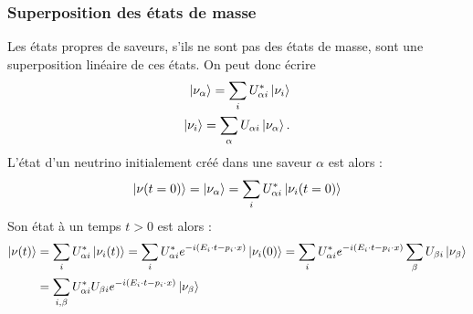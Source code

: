       \subsubsection{Superposition des états de masse}
        Les états propres de saveurs, s'ils ne sont pas des états de masse, sont une superposition linéaire de ces états. On peut donc écrire
        \begin{eqnarray}
          \ket{\nu_{\alpha}} = \sum_i U_{\alpha i}^*\ket{\nu_i} \label{eq::alphatoi} \\
          \ket{\nu_i} = \sum_{\alpha} U_{\alpha i}\ket{\nu_{\alpha}}.
        \end{eqnarray}
        L'état d'un neutrino initialement créé dans une saveur $\alpha$ est alors :
        \begin{equation}
          \ket{\nu(t=0)} = \ket{\nu_{\alpha}} = \sum_i U_{\alpha i}^*\ket{\nu_i(t=0)}
        \end{equation}
        Son état à un temps $t > 0$ est alors :
        \begin{equation}\label{eq::0tot}
          \begin{split}
            \ket{\nu(t)} &=\sum_{i} U_{\alpha i}^*\ket{\nu_i(t)} = \sum_{i} U_{\alpha i}^* e^{-i(E_i\cdot t - p_i\cdot x)}\ket{\nu_i(0)} = \sum_{i} U_{\alpha i}^* e^{-i(E_i\cdot t - p_i\cdot x)}\sum_{\beta}U_{\beta i}\ket{\nu_{\beta}}\\ & = \sum_{i,\beta} U_{\alpha i}^*U_{\beta i} e^{-i(E_i\cdot t - p_i\cdot x)}\ket{\nu_{\beta}}
          \end{split}
        \end{equation}

